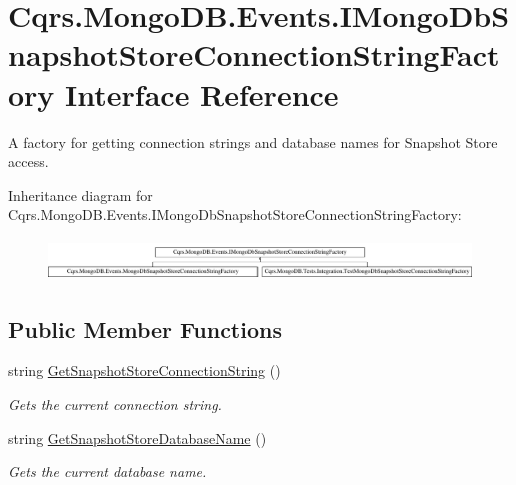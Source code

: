 \hypertarget{interfaceCqrs_1_1MongoDB_1_1Events_1_1IMongoDbSnapshotStoreConnectionStringFactory}{}\section{Cqrs.\+Mongo\+D\+B.\+Events.\+I\+Mongo\+Db\+Snapshot\+Store\+Connection\+String\+Factory Interface Reference}
\label{interfaceCqrs_1_1MongoDB_1_1Events_1_1IMongoDbSnapshotStoreConnectionStringFactory}


A factory for getting connection strings and database names for Snapshot Store access.  


Inheritance diagram for Cqrs.\+Mongo\+D\+B.\+Events.\+I\+Mongo\+Db\+Snapshot\+Store\+Connection\+String\+Factory\+:\begin{figure}[H]
\begin{center}
\leavevmode
\includegraphics[height=1.104536cm]{interfaceCqrs_1_1MongoDB_1_1Events_1_1IMongoDbSnapshotStoreConnectionStringFactory}
\end{center}
\end{figure}
\subsection*{Public Member Functions}
\begin{DoxyCompactItemize}
\item 
string \hyperlink{interfaceCqrs_1_1MongoDB_1_1Events_1_1IMongoDbSnapshotStoreConnectionStringFactory_a634bf6d5d35873cde881588a4ea5f546_a634bf6d5d35873cde881588a4ea5f546}{Get\+Snapshot\+Store\+Connection\+String} ()
\begin{DoxyCompactList}\small\item\em Gets the current connection string. \end{DoxyCompactList}\item 
string \hyperlink{interfaceCqrs_1_1MongoDB_1_1Events_1_1IMongoDbSnapshotStoreConnectionStringFactory_ab04ecd4d9529dca4ea648d38cb5d4b78_ab04ecd4d9529dca4ea648d38cb5d4b78}{Get\+Snapshot\+Store\+Database\+Name} ()
\begin{DoxyCompactList}\small\item\em Gets the current database name. \end{DoxyCompactList}\end{DoxyCompactItemize}


